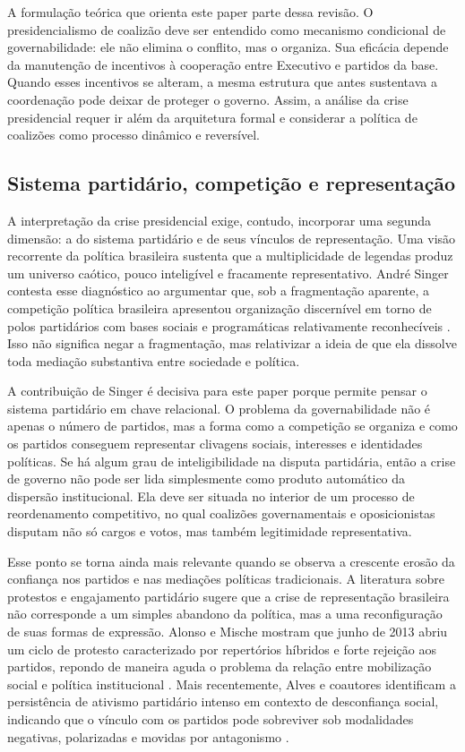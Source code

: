 \documentclass[12pt,a4paper]{article}
\begin{document}
A formulação teórica que orienta este paper parte dessa revisão. O presidencialismo de coalizão deve ser entendido como mecanismo condicional de governabilidade: ele não elimina o conflito, mas o organiza. Sua eficácia depende da manutenção de incentivos à cooperação entre Executivo e partidos da base. Quando esses incentivos se alteram, a mesma estrutura que antes sustentava a coordenação pode deixar de proteger o governo. Assim, a análise da crise presidencial requer ir além da arquitetura formal e considerar a política de coalizões como processo dinâmico e reversível.

\subsection{Sistema partidário, competição e representação}
\label{sec:org3aa52b2}
A interpretação da crise presidencial exige, contudo, incorporar uma segunda dimensão: a do sistema partidário e de seus vínculos de representação. Uma visão recorrente da política brasileira sustenta que a multiplicidade de legendas produz um universo caótico, pouco inteligível e fracamente representativo. André Singer contesta esse diagnóstico ao argumentar que, sob a fragmentação aparente, a competição política brasileira apresentou organização discernível em torno de polos partidários com bases sociais e programáticas relativamente reconhecíveis \textcite{singersd_tres_partidos}. Isso não significa negar a fragmentação, mas relativizar a ideia de que ela dissolve toda mediação substantiva entre sociedade e política.

A contribuição de Singer é decisiva para este paper porque permite pensar o sistema partidário em chave relacional. O problema da governabilidade não é apenas o número de partidos, mas a forma como a competição se organiza e como os partidos conseguem representar clivagens sociais, interesses e identidades políticas. Se há algum grau de inteligibilidade na disputa partidária, então a crise de governo não pode ser lida simplesmente como produto automático da dispersão institucional. Ela deve ser situada no interior de um processo de reordenamento competitivo, no qual coalizões governamentais e oposicionistas disputam não só cargos e votos, mas também legitimidade representativa.

Esse ponto se torna ainda mais relevante quando se observa a crescente erosão da confiança nos partidos e nas mediações políticas tradicionais. A literatura sobre protestos e engajamento partidário sugere que a crise de representação brasileira não corresponde a um simples abandono da política, mas a uma reconfiguração de suas formas de expressão. Alonso e Mische mostram que junho de 2013 abriu um ciclo de protesto caracterizado por repertórios híbridos e forte rejeição aos partidos, repondo de maneira aguda o problema da relação entre mobilização social e política institucional \textcite{alonso2016_changing_repertoires}. Mais recentemente, Alves e coautores identificam a persistência de ativismo partidário intenso em contexto de desconfiança social, indicando que o vínculo com os partidos pode sobreviver sob modalidades negativas, polarizadas e movidas por antagonismo \textcite{alves2024_rage_within}.
\end{document}
